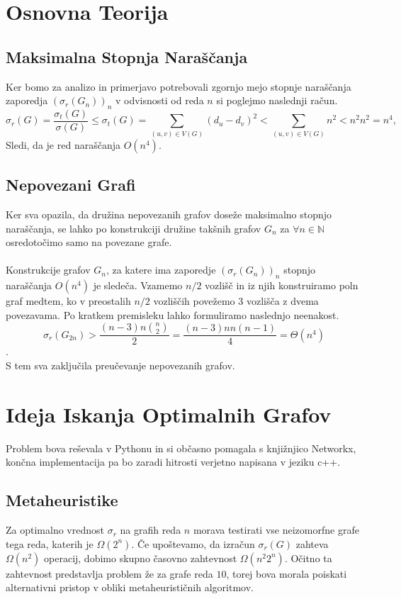 \documentclass[ letterpaper, titlepage, fleqn]{article}
\begin{document}
\section{Osnovna Teorija}

\subsection{Maksimalna Stopnja Naraščanja}
Ker bomo za analizo in primerjavo potrebovali zgornjo mejo stopnje naraščanja
zaporedja $(\sigma_r(G_n))_n$ v odvisnosti od reda $n$ si poglejmo 
naslednji račun.
$$
\sigma_r(G) = \frac{\sigma_t(G)}{\sigma(G)} 
\leq \sigma_t(G)
= \sum_{(u, v) \in V(G)}(d_u - d_v)^2 
< \sum_{(u, v) \in V(G)}n^2
< n^2  n^2 = n^4,
$$
Sledi, da je red naraščanja $O(n^4)$.

\subsection{Nepovezani Grafi}
Ker sva opazila, da družina nepovezanih grafov doseže maksimalno stopnjo naraščanja,
se lahko po konstrukciji družine takšnih grafov $G_n$ za $\forall n \in \mathbb{N}$
osredotočimo samo na povezane grafe.
\\\\
Konstrukcije grafov $G_n$, za katere ima zaporedje $(\sigma_r(G_n))_n$ stopnjo 
naraščanja $O(n^4)$ je sledeča.
Vzamemo $n / 2$ vozlišč in iz njih konstruiramo poln graf
medtem, ko v preostalih $n /2$ vozliščih povežemo 3 vozlišča z dvema povezavama.
Po kratkem premisleku lahko formuliramo naslednjo neenakost.
$$\sigma_r(G_{2n}) > \frac{(n - 3)n \binom{n}{2}}{2} = \frac{(n - 3)n n(n - 1)}{4} = \Theta(n^4)$$.
\\
S tem sva zaključila preučevanje nepovezanih grafov.

\section{Ideja Iskanja Optimalnih Grafov}
Problem bova reševala v Pythonu in si občasno pomagala s knjižnjico Networkx,
končna implementacija pa bo zaradi hitrosti verjetno napisana v jeziku c++.

\subsection{Metaheuristike}
Za optimalno vrednost $\sigma_r$ na grafih reda $n$ morava testirati vse neizomorfne
grafe tega reda, katerih je $\Omega(2^n)$. Če upoštevamo, da izračun $\sigma_r(G)$ 
zahteva $\Omega(n^2)$ operacij, dobimo skupno časovno zahtevnost $\Omega(n^2 2^n)$.
Očitno ta zahtevnost predstavlja problem že za grafe reda $10$, 
torej bova morala poiskati alternativni pristop v obliki metaheurističnih algoritmov. \\
\end{document}
